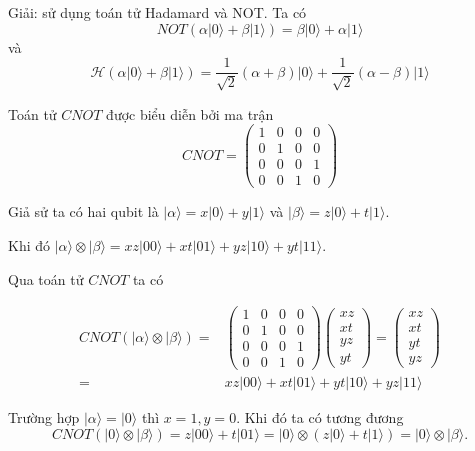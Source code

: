 Giải: sử dụng toán tử Hadamard và NOT. Ta có \[ NOT(\alpha \lvert 0 \rangle + \beta \lvert 1 \rangle) = \beta \lvert 0 \rangle + \alpha \lvert 1 \rangle\] và \[\mathcal{H} (\alpha \lvert 0 \rangle + \beta \lvert 1 \rangle) = \dfrac{1}{\sqrt{2}} (\alpha + \beta) \lvert 0 \rangle + \dfrac{1}{\sqrt{2}} (\alpha - \beta) \lvert 1 \rangle \]

Toán tử $CNOT$ được biểu diễn bởi ma trận \[ CNOT = \begin{pmatrix}
    1 & 0 & 0 & 0 \\ 0 & 1 & 0 & 0 \\ 0 & 0 & 0 & 1 \\ 0 & 0 & 1 & 0
\end{pmatrix}\]

Giả sử ta có hai qubit là $\lvert \alpha \rangle = x \lvert 0 \rangle + y \lvert 1 \rangle$ và $\lvert \beta \rangle = z \lvert 0 \rangle + t \lvert 1 \rangle$.

Khi đó $\lvert \alpha \rangle \otimes \lvert \beta \rangle = xz \lvert 00 \rangle + xt \lvert 01 \rangle + yz \lvert 10 \rangle + yt \lvert 11 \rangle$.

Qua toán tử $CNOT$ ta có

\begin{align*}
    CNOT (\lvert \alpha \rangle \otimes \lvert \beta \rangle) 
    = & \begin{pmatrix}
    1 & 0 & 0 & 0 \\ 0 & 1 & 0 & 0 \\ 0 & 0 & 0 & 1 \\ 0 & 0 & 1 & 0
    \end{pmatrix} \begin{pmatrix}
    xz \\ xt \\ yz \\ yt
    \end{pmatrix}
    = \begin{pmatrix}
    xz \\ xt \\ yt \\ yz
    \end{pmatrix} \\
    = & xz \lvert 00 \rangle + xt \lvert 01 \rangle + yt \lvert 10 \rangle + yz \lvert 11 \rangle
\end{align*}

Trường hợp $\lvert \alpha \rangle = \lvert 0 \rangle$ thì $x = 1, y = 0$. Khi đó ta có tương đương \[ CNOT (\lvert 0 \rangle \otimes \lvert \beta \rangle) = z \lvert 00 \rangle + t \lvert 01 \rangle = \lvert 0 \rangle \otimes (z \lvert 0 \rangle + t \lvert 1 \rangle) = \lvert 0 \rangle \otimes \lvert \beta \rangle. \]


